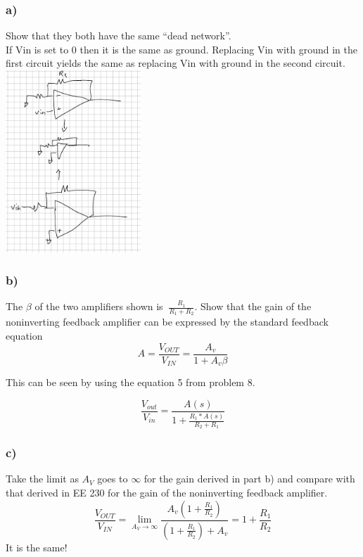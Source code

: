 \documentclass[10pt,a4paper]{article}
\begin{document}
\subsubsection*{a)}
Show that they both have the same “dead network”.\\

If Vin is set to 0 then it is the same as ground. Replacing Vin with ground in the first circuit yields the same as replacing Vin with ground in the second circuit.\\
\includegraphics[width=2in]{images/p10p1.png} \\

\subsubsection*{b)}
The \(\beta\) of the two amplifiers shown is \(\ \frac{R_1}{R_1 + R_2}\). Show that the gain of the
noninverting feedback amplifier can be expressed by the standard feedback
equation
\[
A = \frac{V_{OUT}}{V_{IN}} = \frac{A_v }{1+ A_v \beta}
\]



This can be seen by using the equation 5 from problem 8.

\begin{equation}
\frac{V_{out}}{V_{in}} = \frac{A(s)}{1+\frac{R_1 * A(s)}{R_2 + R_1}} 
\end{equation}


\subsubsection*{c)}
Take the limit as \(A_V\) goes to $\infty$ for the gain derived in part b) and compare with
that derived in EE 230 for the gain of the noninverting feedback amplifier.\\
\begin{equation}
\frac{V_{OUT}}{V_{IN}} = \lim_{A_V\to\infty} \frac{A_v (1 + \frac{R_1}{R_2})}{(1 + \frac{R_1}{R_2})+ A_v } = 1 + \frac{R_1}{R_2}
\end{equation}
It is the same!
\end{document}
